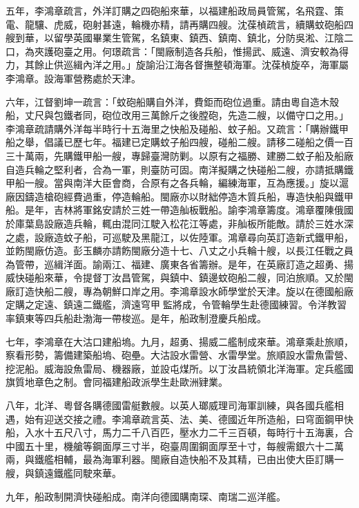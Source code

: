 \begin{pinyinscope}
五年，李鴻章疏言，外洋訂購之四砲船來華，以福建船政局員管駕，名飛霆、策電、龍驤、虎威，砲射甚遠，輪機亦精，請再購四艘。沈葆楨疏言，續購蚊砲船四艘到華，以留學英國畢業生管駕，名鎮東、鎮西、鎮南、鎮北，分防吳淞、江陰二口，為夾護砲臺之用。何璟疏言：「閩廠制造各兵船，惟揚武、威遠、濟安較為得力，其餘止供巡緝內洋之用。」旋諭沿江海各督撫整頓海軍。沈葆楨旋卒，海軍屬李鴻章。設海軍營務處於天津。

六年，江督劉坤一疏言：「蚊砲船購自外洋，費鉅而砲位過重。請由粵自造木殼船，丈尺與包鐵者同，砲位改用三萬餘斤之後膛砲，先造二艘，以備守口之用。」李鴻章疏請購外洋每半時行十五海里之快船及碰船、蚊子船。又疏言：「購辦鐵甲船之舉，倡議已歷七年。福建已定購蚊子船四艘，碰船二艘。請移二碰船之價一百三十萬兩，先購鐵甲船一艘，專歸臺灣防剿。以原有之福勝、建勝二蚊子船及船廠自造兵輪之堅利者，合為一軍，則臺防可固。南洋擬購之快碰船二艘，亦請抵購鐵甲船一艘。當與南洋大臣會商，合原有之各兵輪，編練海軍，互為應援。」旋以滬廠因鑄造槍砲經費過重，停造輪船。閩廠亦以財絀停造木質兵船，專造快船與鐵甲船。是年，吉林將軍銘安請於三姓一帶造舢板戰船。諭李鴻章籌度。鴻章覆陳俄國於庫葉島設廠造兵輪，輒由混同江駛入松花江等處，非舢板所能敵。請於三姓水深之處，設廠造蚊子船，可巡駛及黑龍江，以佐陸軍。鴻章尋向英訂造新式鐵甲船，並飭閩廠仿造。彭玉麟亦請飭閩廠分造十七、八丈之小兵輪十艘，以長江任戰之員為管帶，巡緝洋面。諭兩江、福建、廣東各省籌辦。是年，在英廠訂造之超勇、揚威快碰船來華，令提督丁汝昌管駕，與鎮中、鎮邊蚊砲船二艘，同泊旅順。又於閩廠訂造快船二艘，專為朝鮮口岸之用。李鴻章設水師學堂於天津。旋以在德國船廠定購之定遠、鎮遠二鐵艦，濟遠穹甲監將成，令管輪學生赴德國練習。令洋教習率鎮東等四兵船赴渤海一帶梭巡。是年，船政制澄慶兵船成。

七年，李鴻章在大沽口建船塢。九月，超勇、揚威二艦制成來華。鴻章乘赴旅順，察看形勢，籌備建築船塢、砲壘。大沽設水雷營、水雷學堂。旅順設水雷魚雷營、挖泥船。威海設魚雷局、機器廠，並設屯煤所。以丁汝昌統領北洋海軍。定兵艦國旗質地章色之制。會同福建船政派學生赴歐洲肄業。

八年，北洋、粵督各購德國雷艇數艘。以英人瑯威理司海軍訓練，與各國兵艦相遇，始有迎送交接之禮。李鴻章疏言英、法、美、德國近年所造船，曰穹面鋼甲快船，入水十五尺八寸，馬力二千八百匹，壓水力二千三百頓，每時行十五海裏，合中國五十里，機艙等鋼面厚三寸半，砲臺周圍鋼面厚至十寸，每艘需銀六十二萬兩，與鐵艦相輔，最為海軍利器。閩廠自造快船不及其精，已由出使大臣訂購一艘，與鎮遠鐵艦同駛來華。

九年，船政制開濟快碰船成。南洋向德國購南琛、南瑞二巡洋艦。


\end{pinyinscope}
